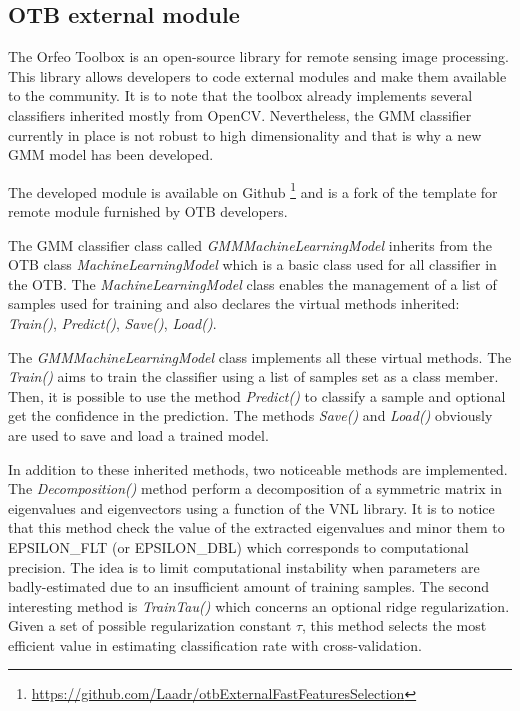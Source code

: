 \documentclass[journal,peerreview,onecolumn]{IEEEtran}
\begin{document}
    \subsection{OTB external module}
    \label{sec:otb-module}

    The Orfeo Toolbox is an open-source library for remote sensing image processing. This library allows developers to code external modules and make them available to the community. It is to note that the toolbox already implements several classifiers inherited mostly from OpenCV. Nevertheless, the GMM classifier currently in place is not robust to high dimensionality and that is why a new GMM model has been developed.

    The developed module is available on Github \footnote{\url{https://github.com/Laadr/otbExternalFastFeaturesSelection}} and is a fork of the template for remote module furnished by OTB developers.

    The GMM classifier class called \emph{GMMMachineLearningModel} inherits from the OTB class \emph{MachineLearningModel} which is a basic class used for all classifier in the OTB. The \emph{MachineLearningModel} class enables the management of a list of samples used for training and also declares the virtual methods inherited: \emph{Train()}, \emph{Predict()}, \emph{Save()}, \emph{Load()}.

    The \emph{GMMMachineLearningModel} class implements all these virtual methods. The \emph{Train()} aims to train the classifier using a list of samples set as a class member. Then, it is possible to use the method \emph{Predict()} to classify a sample and optional get the confidence in the prediction. The methods \emph{Save()} and \emph{Load()} obviously are used to save and load a trained model.

    In addition to these inherited methods, two noticeable methods are implemented. The \emph{Decomposition()} method perform a decomposition of a symmetric matrix in eigenvalues and eigenvectors using a function of the VNL library. It is to notice that this method check the value of the extracted eigenvalues and minor them to EPSILON\_FLT (or EPSILON\_DBL) which corresponds to computational precision.  The idea is to limit computational instability when parameters are badly-estimated due to an insufficient amount of training samples. The second interesting method is \emph{TrainTau()} which concerns an optional ridge regularization. Given a set of possible regularization constant $\tau$, this method selects the most efficient value in estimating classification rate with cross-validation.
\end{document}
